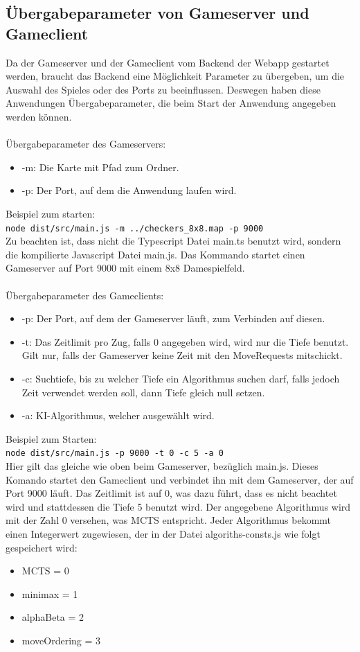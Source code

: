 \documentclass[12pt,a4paper,bibliography=totocnumbered,listof=totocnumbered]{article}
\begin{document}
\begin{appendix}
\pagebreak

\section{Übergabeparameter von Gameserver und Gameclient}
\label{apx:Parameters}
Da der Gameserver und der Gameclient vom Backend der Webapp gestartet werden, braucht das Backend eine Möglichkeit Parameter zu übergeben, 
um die Auswahl des Spieles oder des Ports zu beeinflussen. Deswegen haben diese Anwendungen Übergabeparameter, die beim Start der
Anwendung angegeben werden können. 
\\\\
Übergabeparameter des Gameservers:
\begin{itemize}
    \item -m: Die Karte mit Pfad zum Ordner.
    \item -p: Der Port, auf dem die Anwendung laufen wird.
\end{itemize}
Beispiel zum starten:\\
\texttt{node dist/src/main.js -m ../checkers\_8x8.map -p 9000}\\
Zu beachten ist, dass nicht die Typescript Datei main.ts benutzt wird, sondern die kompilierte Javascript Datei main.js.
Das Kommando startet einen Gameserver auf Port 9000 mit einem 8x8 Damespielfeld.
\\\\
Übergabeparameter des Gameclients:
\begin{itemize}
    \item -p: Der Port, auf dem der Gameserver läuft, zum Verbinden auf diesen.
    \item -t: Das Zeitlimit pro Zug, falls 0 angegeben wird, wird nur die Tiefe benutzt. Gilt nur, falls der Gameserver
    keine Zeit mit den MoveRequests mitschickt.
    \item -c: Suchtiefe, bis zu welcher Tiefe ein Algorithmus suchen darf, falls jedoch Zeit verwendet werden soll, dann Tiefe gleich null setzen.
    \item -a: \ac{KI}-Algorithmus, welcher ausgewählt wird.
\end{itemize}
Beispiel zum Starten:\\
\texttt{node dist/src/main.js -p 9000 -t 0 -c 5 -a 0} \\
Hier gilt das gleiche wie oben beim Gameserver, bezüglich main.js. 
Dieses Komando startet den Gameclient und verbindet ihn mit dem Gameserver, der auf Port 9000 läuft. Das Zeitlimit ist auf 0, was dazu führt, dass es nicht beachtet wird
und stattdessen die Tiefe 5 benutzt wird. Der angegebene Algorithmus wird mit der Zahl 0 versehen, was \ac{MCTS} entspricht.
Jeder Algorithmus bekommt einen Integerwert zugewiesen, der in der Datei algoriths-consts.js wie folgt gespeichert wird: 
\begin{itemize}
    \item \ac{MCTS} = 0
    \item minimax = 1
    \item alphaBeta = 2
    \item moveOrdering = 3
\end{itemize}


\end{appendix}
\end{document}
